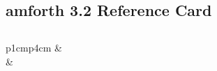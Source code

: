 \documentclass[a4paper,10pt]{article}
\def\colsa{p{1cm}p{4cm}}
\begin{document}
\thispagestyle{empty}
\pagestyle{empty}

\begin{footnotesize}
\section*{\Large amforth 3.2 Reference Card}
\begin{multicols}{3}

\subsection*{}
\begin{tabular}{\colsa}
% 
\verb||  & \verb//\\
              & \verb//\\
\end{tabular}


\end{multicols}
\end{footnotesize}
\end{document}
